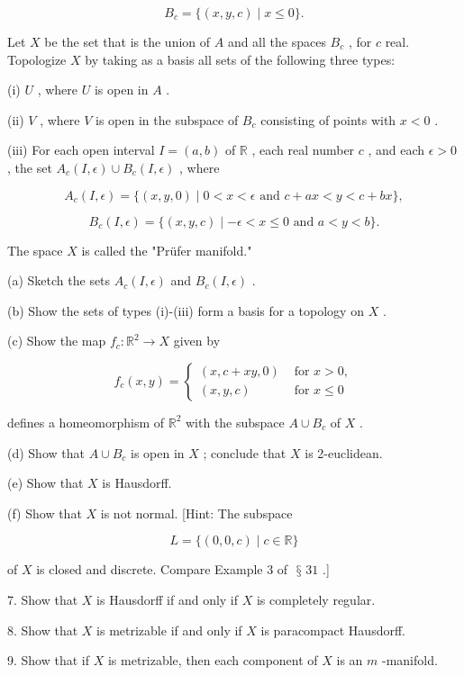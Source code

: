 \documentclass[10pt]{article}
\begin{document}
\[
{B}_{c} = \{ \left( {x,y,c}\right)  \mid  x \leq  0\} .
\]

Let \(X\) be the set that is the union of \(A\) and all the spaces \({B}_{c}\) , for \(c\) real. Topologize \(X\) by taking as a basis all sets of the following three types:

(i) \(U\) , where \(U\) is open in \(A\) .

(ii) \(V\) , where \(V\) is open in the subspace of \({B}_{c}\) consisting of points with \(x < 0\) .

(iii) For each open interval \(I = \left( {a,b}\right)\) of \(\mathbb{R}\) , each real number \(c\) , and each \(\epsilon  > 0\) , the set \({A}_{c}\left( {I,\epsilon }\right)  \cup  {B}_{c}\left( {I,\epsilon }\right)\) , where

\[
{A}_{c}\left( {I,\epsilon }\right)  = \{ \left( {x,y,0}\right)  \mid  0 < x < \epsilon \text{ and }c + {ax} < y < c + {bx}\} ,
\]

\[
{B}_{c}\left( {I,\epsilon }\right)  = \{ \left( {x,y,c}\right)  \mid   - \epsilon  < x \leq  0\text{ and }a < y < b\} .
\]

The space \(X\) is called the "Prüfer manifold."

(a) Sketch the sets \({A}_{c}\left( {I,\epsilon }\right)\) and \({B}_{c}\left( {I,\epsilon }\right)\) .

(b) Show the sets of types (i)-(iii) form a basis for a topology on \(X\) .

(c) Show the map \({f}_{c} : {\mathbb{R}}^{2} \rightarrow  X\) given by

\[
{f}_{c}\left( {x,y}\right)  = \left\{  \begin{array}{ll} \left( {x,c + {xy},0}\right) & \text{ for }x > 0, \\  \left( {x,y,c}\right) & \text{ for }x \leq  0 \end{array}\right.
\]

defines a homeomorphism of \({\mathbb{R}}^{2}\) with the subspace \(A \cup  {B}_{c}\) of \(X\) .

(d) Show that \(A \cup  {B}_{c}\) is open in \(X\) ; conclude that \(X\) is 2-euclidean.

(e) Show that \(X\) is Hausdorff.

(f) Show that \(X\) is not normal. [Hint: The subspace

\[
L = \{ \left( {0,0,c}\right)  \mid  c \in  \mathbb{R}\}
\]

of \(X\) is closed and discrete. Compare Example 3 of \(\text{ § }{31}\) .]

7. Show that \(X\) is Hausdorff if and only if \(X\) is completely regular.

8. Show that \(X\) is metrizable if and only if \(X\) is paracompact Hausdorff.

9. Show that if \(X\) is metrizable, then each component of \(X\) is an \(m\) -manifold.
\end{document}
